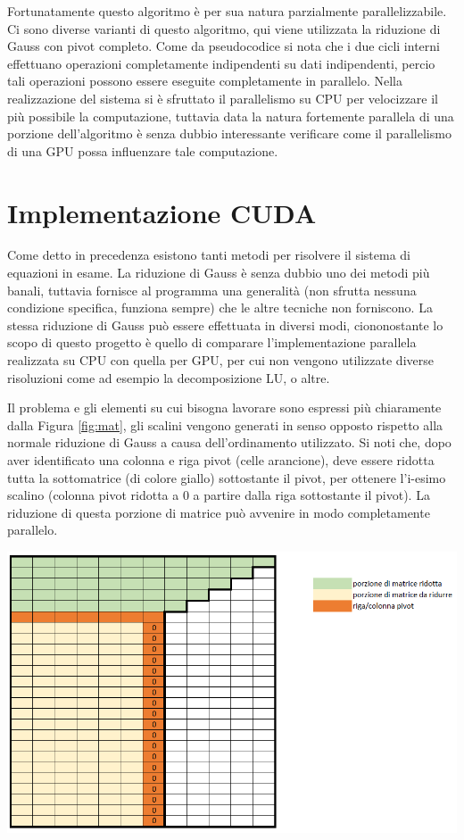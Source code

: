 \documentclass{article}
\begin{document}
Fortunatamente questo algoritmo è per sua natura parzialmente parallelizzabile. Ci sono diverse varianti di questo algoritmo, qui viene utilizzata la riduzione di Gauss con pivot completo. Come da pseudocodice si nota che i due cicli interni effettuano operazioni completamente indipendenti su dati indipendenti, percio tali operazioni possono essere eseguite completamente in parallelo. Nella realizzazione del sistema si è sfruttato il parallelismo su CPU per velocizzare il più possibile la computazione, tuttavia data la natura fortemente parallela di una porzione dell'algoritmo è senza dubbio interessante verificare come il parallelismo di una GPU possa influenzare tale computazione.

\section{Implementazione CUDA}

Come detto in precedenza esistono tanti metodi per risolvere il sistema di equazioni in esame. La riduzione di Gauss è senza dubbio uno dei metodi più banali, tuttavia fornisce al programma una generalità (non sfrutta nessuna condizione specifica, funziona sempre) che le altre tecniche non forniscono. La stessa riduzione di Gauss può essere effettuata in diversi modi, ciononostante lo scopo di questo progetto è quello di comparare l'implementazione parallela realizzata su CPU con quella per GPU, per cui non vengono utilizzate diverse risoluzioni come ad esempio la decomposizione LU, o altre.

Il problema e gli elementi su cui bisogna lavorare sono espressi più chiaramente dalla Figura \ref{fig:mat}, gli scalini vengono generati in senso opposto rispetto alla normale riduzione di Gauss a causa dell'ordinamento utilizzato. Si noti che, dopo aver identificato una colonna e riga pivot (celle arancione), deve essere ridotta tutta la sottomatrice (di colore giallo) sottostante il pivot, per ottenere l'i-esimo scalino (colonna pivot ridotta a 0 a partire dalla riga sottostante il pivot). La riduzione di questa porzione di matrice può avvenire in modo completamente parallelo.

	\begin{center}
		\includegraphics[width = \textwidth]{matrice.png}
		\label{fig:mat}
	\end{center}
\end{document}
